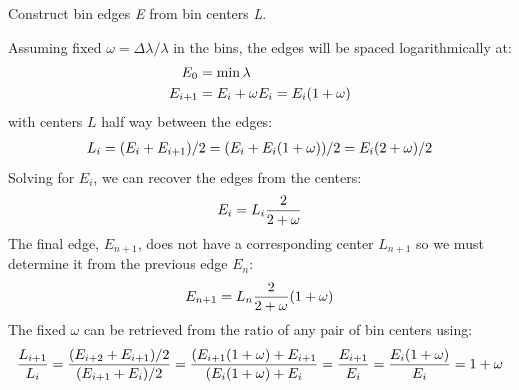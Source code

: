 \documentclass[letterpaper,10pt,english]{sphinxmanual}
\begin{document}

\begin{fulllineitems}
\label{api/resolution:refl1d.resolution.binedges}
Construct bin edges \emph{E} from bin centers \emph{L}.

Assuming fixed $\omega = \Delta\lambda/\lambda$ in the bins, the
edges will be spaced logarithmically at:
\begin{gather}
\begin{split}E_0     &= \min \lambda \\
E_{i+1} &= E_i + \omega E_i = E_i (1+\omega)\end{split}\notag
\end{gather}
with centers $L$ half way between the edges:
\begin{gather}
\begin{split}L_i = (E_i+E_{i+1})/2
    = (E_i + E_i (1+\omega))/2
    = E_i (2 + \omega)/2\end{split}\notag
\end{gather}
Solving for $E_i$, we can recover the edges from the centers:
\begin{gather}
\begin{split}E_i = L_i \frac{2}{2+\omega}\end{split}\notag
\end{gather}
The final edge, $E_{n+1}$, does not have a corresponding center
$L_{n+1}$ so we must determine it from the previous edge $E_n$:
\begin{gather}
\begin{split}E_{n+1} = L_n \frac{2}{2+\omega}(1+\omega)\end{split}\notag
\end{gather}
The fixed $\omega$ can be retrieved from the ratio of any pair
of bin centers using:
\begin{gather}
\begin{split}\frac{L_{i+1}}{L_i} = \frac{ (E_{i+2}+E_{i+1})/2 }{ (E_{i+1}+E_i)/2 }
                  = \frac{ (E_{i+1}(1+\omega)+E_{i+1} }
                          { (E_i(1+\omega)+E_i }
                  = \frac{E_{i+1}}{E_i}
                  = \frac{E_i(1+\omega)}{E_i} = 1 + \omega\end{split}\notag
\end{gather}
\end{fulllineitems}

\end{document}
